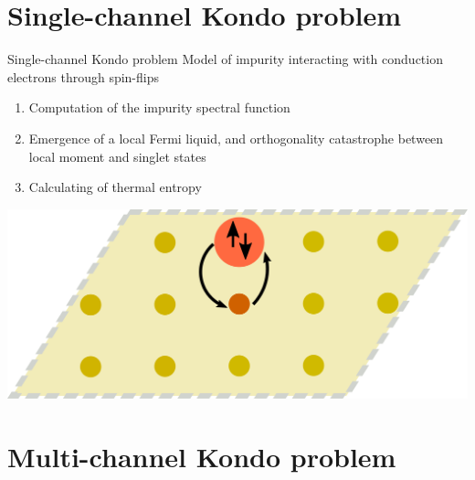 \documentclass[11pt,aspectratio=169]{beamer}
\begin{document}
\section{Single-channel Kondo problem}

\begin{frame}{Single-channel Kondo problem}
Model of impurity interacting with conduction electrons through spin-flips\\[20pt]

\begin{minipage}{0.59\textwidth}
\begin{enumerate}
\item Computation of the impurity spectral function\\[20pt]
\item Emergence of a local Fermi liquid, and orthogonality catastrophe between local moment and singlet states\\[20pt]
\item Calculating of thermal entropy\\[20pt]
\end{enumerate}
\end{minipage}
\begin{minipage}{0.4\textwidth}
	\includegraphics[width=\textwidth]{kondo-effect.pdf}
\end{minipage}

\end{frame}

\section{Multi-channel Kondo problem}
\end{document}
